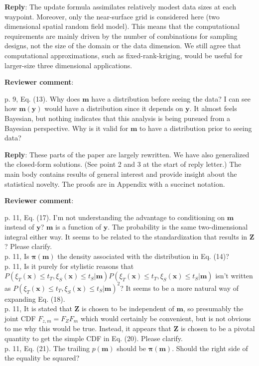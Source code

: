 \documentclass[a4paper]{article}
\newcommand{\bm}{ {\boldsymbol m} }
\newcommand{\bx}{ {\boldsymbol x} }
\newcommand{\by}{ {\boldsymbol y} }
\newcommand{\bZ}{ {\boldsymbol Z} }
\newcommand{\bpi}{ {\boldsymbol \pi} }
\def\revcom{\textbf{Reviewer comment}}
\def\reply{\textbf{Reply}}
\begin{document}
\begin{answers}
\reply: The update formula assimilates relatively modest data sizes at each waypoint. Moreover, only the near-surface grid is considered here (two dimensional spatial random field model). This means that the computational requirements are mainly driven by the number of combinations for sampling designs, not the size of the domain or the data dimension. 
We still agree that computational approximations, such as fixed-rank-kriging, would be useful for larger-size three dimensional applications. 

\item{\revcom  :}\label{r2c6}

p. 9, Eq. (13). Why does $\bm$ have a distribution before seeing the data? I can see how $\bm(\by)$ would have a distribution since it depends on $\by$. It almost feels Bayesian, but nothing indicates that this analysis is being pursued from a Bayesian perspective. Why is it valid for $\bm$ to have a distribution prior to seeing data?

\reply: These parts of the paper are largely rewritten. We have also generalized the closed-form solutions. (See point 2 and 3 at the start of reply letter.) The main body contains results of general interest and provide insight about the statistical novelty. The proofs are in Appendix with a succinct notation.

\item{\revcom :}\label{r2c7}

p. 11, Eq. (17). I’m not understanding the advantage to conditioning on $\bm$ instead of $\by$? $\bm$ is a function of $\by$. The probability is the same two-dimensional integral either way. It seems to be related to the standardization that results in $\bZ$? Please clarify.\\
p. 11, Is $\bpi(\bm)$ the density associated with the distribution in Eq. (14)? \\
p. 11, Is it purely for stylistic reasons that $P(\xi_T(\bx) \leq t_T, \xi_S(\bx) \leq t_S |\bm)P(\xi_T(\bx) \leq t_T, \xi_S(\bx) \leq t_S |\bm)$ isn’t written as $P(\xi_T(\bx) \leq t_T, \xi_S(\bx) \leq t_S |\bm)^2$? It seems to be a more natural way of expanding Eq. (18). \\
p. 11, It is stated that $\bZ$ is chosen to be independent of $\bm$, so presumably the joint CDF $F_{z,m}=F_{Z}F_m$ which would certainly be convenient, but is not obvious to me why this would be true. 
Instead, it appears that $\bZ$ is chosen to be a pivotal quantity to get the simple CDF in Eq. (20). Please clarify.\\
p. 11, Eq. (21). The trailing $p(\bm)$ should be $\bpi(\bm)$. Should the right side of the equality be squared? 


\end{answers}
\end{document}
